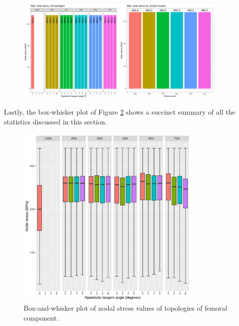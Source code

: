\documentclass[../main.tex]{subfiles}
\begin{document}
\begin{figure}[h!]
  \centering
  \includegraphics[width=0.45\textwidth]{images/results/plots/femoral/stress/maximum_stress.png}
  \hfill
  \includegraphics[width=0.45\textwidth]{images/results/plots/femoral/stress/femoral_max_group_stress.png}
  \caption{}
  \label{fig:maximum_stresses}
\end{figure}

Lastly, the box-whisker plot of Figure \ref{fig:stress_boxwhisker} shows a succinct summary of all the statistics discussed in this section.

\begin{figure}[h!]
  \centering
  \includegraphics[width=0.8\textwidth]{images/results/plots/femoral/stress/boxplots.png}
  \caption{Box-and-whisker plot of nodal stress values of topologies of femoral component.}
  \label{fig:stress_boxwhisker}
\end{figure}
\end{document}
